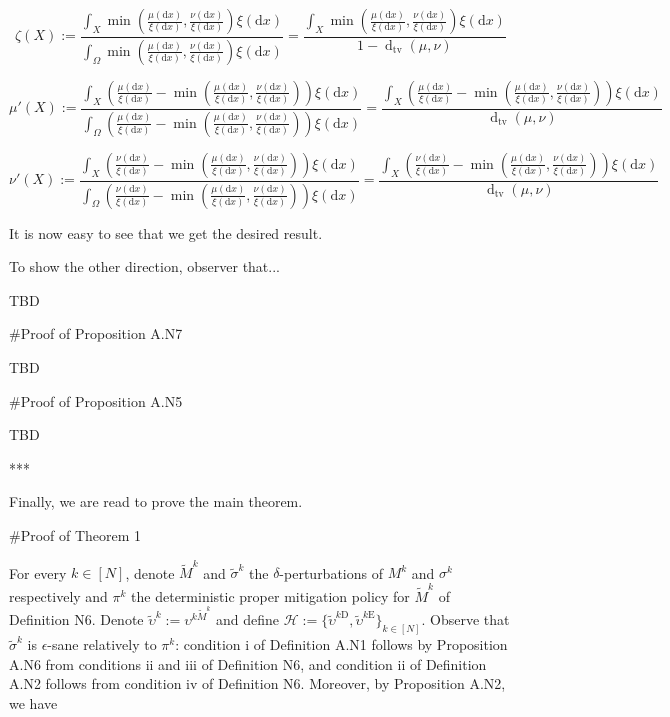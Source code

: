 \documentclass[a4paper]{article}
\newcommand{\AP}[1]{\left(#1\right)}
\newcommand{\D}{\mathrm{d}}
\newcommand{\Dtva}[1]{\operatorname{d}_{\text{tv}}\AP{#1}}
\newcommand{\St}{\mathcal{S}}
\newcommand{\Hy}{\mathcal{H}}
\newcommand{\RMD}{\mathrm{D}}
\newcommand{\RME}{\mathrm{E}}
\newcommand{\RMF}{\mathrm{F}}
\newcommand{\SF}{\St^{\RMF}}
\begin{document}
$$\zeta(X) := \frac{\int_X\min\AP{\frac{\mu(\D x)}{\xi(\D x)},\frac{\nu(\D x)}{\xi(\D x)}}\xi(\D x)}{\int_\Omega\min\AP{\frac{\mu(\D x)}{\xi(\D x)},\frac{\nu(\D x)}{\xi(\D x)}}\xi(\D x)}=\frac{\int_X\min\AP{\frac{\mu(\D x)}{\xi(\D x)},\frac{\nu(\D x)}{\xi(\D x)}}\xi(\D x)}{1-\Dtva{\mu,\nu}}$$

$$\mu'(X):=\frac{\int_X \AP{\frac{\mu(\D x)}{\xi(\D x)}-\min\AP{\frac{\mu(\D x)}{\xi(\D x)},\frac{\nu(\D x)}{\xi(\D x)}}} \xi(\D x)}{\int_\Omega \AP{\frac{\mu(\D x)}{\xi(\D x)}-\min\AP{\frac{\mu(\D x)}{\xi(\D x)},\frac{\nu(\D x)}{\xi(\D x)}}} \xi(\D x)}=\frac{\int_X \AP{\frac{\mu(\D x)}{\xi(\D x)}-\min\AP{\frac{\mu(\D x)}{\xi(\D x)},\frac{\nu(\D x)}{\xi(\D x)}}} \xi(\D x)}{\Dtva{\mu,\nu}}$$

$$\nu'(X):=\frac{\int_X \AP{\frac{\nu(\D x)}{\xi(\D x)}-\min\AP{\frac{\mu(\D x)}{\xi(\D x)},\frac{\nu(\D x)}{\xi(\D x)}}} \xi(\D x)}{\int_\Omega \AP{\frac{\nu(\D x)}{\xi(\D x)}-\min\AP{\frac{\mu(\D x)}{\xi(\D x)},\frac{\nu(\D x)}{\xi(\D x)}}} \xi(\D x)}=\frac{\int_X \AP{\frac{\nu(\D x)}{\xi(\D x)}-\min\AP{\frac{\mu(\D x)}{\xi(\D x)},\frac{\nu(\D x)}{\xi(\D x)}}} \xi(\D x)}{\Dtva{\mu,\nu}}$$

It is now easy to see that we get the desired result.

To show the other direction, observer that...

TBD

\#Proof of Proposition A.N7


TBD

\#Proof of Proposition A.N5


TBD

***

Finally, we are read to prove the main theorem.

\#Proof of Theorem 1

For every $k \in [N]$, denote $\tilde{M}^k$ and $\tilde{\sigma}^k$ the $\delta$-perturbations of $M^k$ and $\sigma^k$ respectively and $\pi^k$ the deterministic proper mitigation policy for $\tilde{M}^k$ of Definition N6. Denote $\tilde{\upsilon}^k:=\upsilon^{k\tilde{M}^k}$ and define $\Hy:=\{\tilde{\upsilon}^{k\RMD},\tilde{\upsilon}^{k\RME}\}_{k \in [N]}$. Observe that $\tilde{\sigma}^{k}$ is $\epsilon$-sane relatively to $\pi^k$: condition i of Definition A.N1 follows by Proposition A.N6 from conditions ii and iii of Definition N6, and condition ii of Definition A.N2 follows from condition iv of Definition N6. Moreover, by Proposition A.N2, we have
\end{document}

